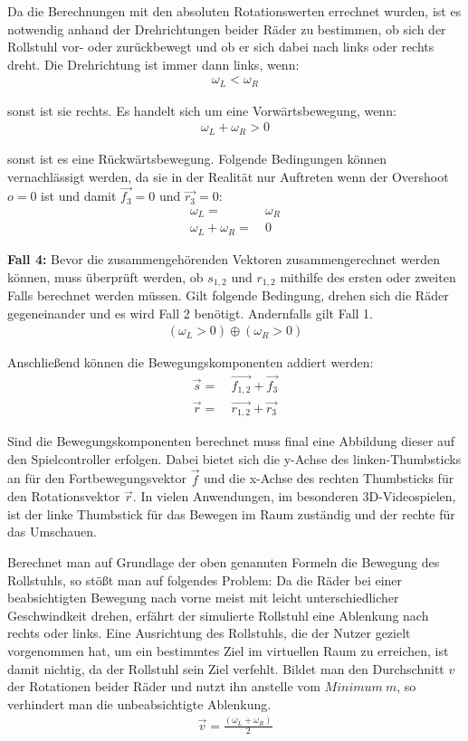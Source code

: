 Da die Berechnungen mit den absoluten Rotationswerten errechnet wurden, ist es notwendig anhand der Drehrichtungen beider Räder zu bestimmen, ob sich der Rollstuhl vor- oder zurückbewegt und ob er sich dabei nach links oder rechts dreht.
Die Drehrichtung ist immer dann links, wenn:
\begin{align}
    \omega_L < \omega_R
\end{align}

sonst ist sie rechts.
Es handelt sich um eine Vorwärtsbewegung, wenn:
\begin{align}
    \omega_L + \omega_R > 0
\end{align}

sonst ist es eine Rückwärtsbewegung.
Folgende Bedingungen können vernachlässigt werden, da sie in der Realität nur Auftreten wenn der Overshoot $o = 0$ ist und damit $\vec{f_3} = 0$ und $\vec{r_3} = 0$:
\begin{align}
    \omega_L =            & \ \omega_R \\
    \omega_L + \omega_R = & \ 0
\end{align}

\textbf{Fall 4:}
Bevor die zusammengehörenden Vektoren zusammengerechnet werden können, muss überprüft werden, ob $s_{1,2}$ und $r_{1,2}$ mithilfe des ersten oder zweiten Falls berechnet werden müssen.
Gilt folgende Bedingung, drehen sich die Räder gegeneinander und es wird Fall 2 benötigt.
Andernfalls gilt Fall 1.
\begin{align}
    (\omega_L > 0) \oplus (\omega_R > 0)
\end{align}

Anschließend können die Bewegungskomponenten addiert werden:
\begin{align}
    \vec{s} = & \ \vec{f_{1,2}} + \vec{f_3} \\
    \vec{r} = & \ \vec{r_{1,2}} + \vec{r_3}
\end{align}

Sind die Bewegungskomponenten berechnet muss final eine Abbildung dieser auf den Spielcontroller erfolgen.
Dabei bietet sich die y-Achse des linken-Thumbsticks an für den Fortbewegungsvektor $\vec{f}$ und die x-Achse des rechten Thumbsticks für den Rotationsvektor $\vec{r}$.
In vielen Anwendungen, im besonderen 3D-Videospielen, ist der linke Thumbstick für das Bewegen im Raum zuständig und der rechte für das Umschauen.

Berechnet man auf Grundlage der oben genannten Formeln die Bewegung des Rollstuhls, so stößt man auf folgendes Problem:
Da die Räder bei einer beabsichtigten Bewegung nach vorne meist mit leicht unterschiedlicher Geschwindkeit drehen, erfährt der simulierte Rollstuhl eine Ablenkung nach rechts oder links.
Eine Ausrichtung des Rollstuhls, die der Nutzer gezielt vorgenommen hat, um ein bestimmtes Ziel im virtuellen Raum zu erreichen, ist damit nichtig, da der Rollstuhl sein Ziel verfehlt.
Bildet man den Durchschnitt $v$ der Rotationen beider Räder und nutzt ihn anstelle vom $Minimum\ m$, so verhindert man die unbeabsichtigte Ablenkung.
\begin{align}
    \vec{v} = \frac {(\omega_L + \omega_R)} {2}
\end{align}

